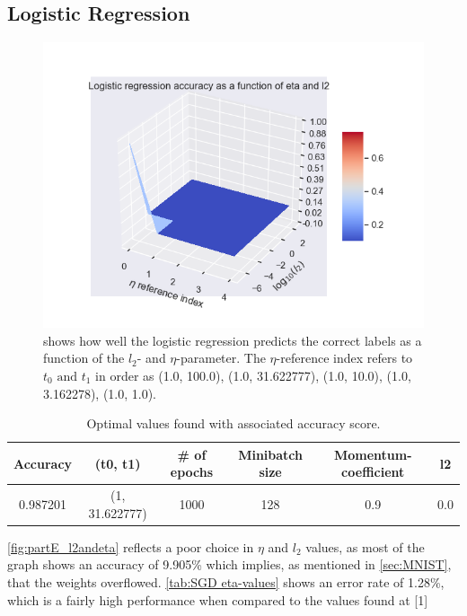 \documentclass[a4paper, UKenglish]{article}
\newcommand{\0}{\mathbf{0}}
\newcommand{\1}{\mathbf{1}}
\begin{document}
\subsection{Logistic Regression}
\begin{figure}[H]
        \centering 
        \includegraphics[scale=0.7]{images/partE_l2andeta.png} 
        \caption{shows how well the logistic regression predicts the correct labels as a function of the $l_2$- and $\eta$-parameter. The $\eta$-reference index refers to $t_0 \text{ and } t_1$ in order as (1.0, 100.0), (1.0, 31.622777), (1.0, 10.0), (1.0, 3.162278), (1.0, 1.0).}
        \label{fig:partE_l2andeta}
\end{figure}


\begin{table}[H] 
\centering
\caption{Optimal values found with associated accuracy score.}
\label{tab:LogReg optimal values}
\begin{tabular}{|c|c|c|c|c|c|}
	\hline
  Accuracy & (t0, t1) & \# of epochs & Minibatch size & Momentum-coefficient & l2
  \\
  \hline
  0.987201 & (1, 31.622777) & 1000 & 128 & 0.9 & 0.0 \\
	\hline
\end{tabular}
\end{table}



\autoref{fig:partE_l2andeta} reflects a poor choice in $\eta$ and $l_2$ values, as most of the graph shows an accuracy of 9.905\% which implies, as mentioned in \autoref{sec:MNIST}, that the weights overflowed. \autoref{tab:SGD eta-values} shows an error rate of 1.28\%, which is a fairly high performance when compared to the values found at [1]
\end{document}

